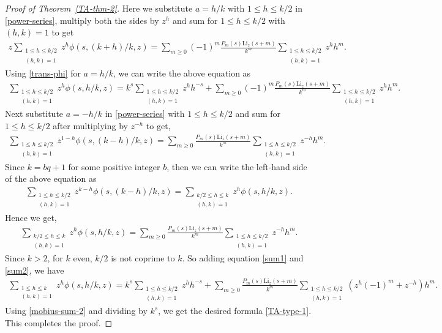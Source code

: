 \documentclass[12pt]{amsart}
\newcommand{\thmref}[1]{Theorem~\ref{#1}}
\begin{document}
\begin{proof}[Proof of \thmref{TA-thm-2}]
Here we substitute $a=h/k$ with $1\leq h\leq k/2$ in \eqref{power-series}, multiply both the sides by $z^h$ and sum for $1\leq h\leq k/2$ with $(h,k)=1$ to get
\begin{align}
z\sum_{ \substack{1\leq h\leq k/2 \\(h,k)=1}}z^h\phi(s,(k+h)/k,z)=
\sum_{m\geq0}(-1)^m\frac{P_m(s)\mathrm{Li}_z(s+m)}{k^m}\sum_{\substack{1\leq h\leq k/2 \\(h,k)=1}}z^hh^m.
\end{align}
Using \eqref{trans-phi}  for $a=h/k$, we can write the above equation as
\begin{align}\label{sum1}
\sum_{ \substack{1\leq h\leq k/2 \\(h,k)=1}}z^h\phi(s,h/k,z)=k^s\sum_{ \substack{1\leq h\leq k/2 \\(h,k)=1}}z^hh^{-s}+
\sum_{m\geq0}(-1)^m\frac{P_m(s)\mathrm{Li}_z(s+m)}{k^m}\sum_{\substack{1\leq h\leq k/2 \\(h,k)=1}}z^hh^m.
\end{align}
Next substitute $a=-h/k$ in \eqref{power-series} with $1\leq h\leq k/2$ and sum for $1\leq h\leq k/2$ after multiplying by $z^{-h}$ to get,
\begin{align*}
\sum_{ \substack{1\leq h\leq k/2 \\(h,k)=1}}z^{1-h}\phi(s,(k-h)/k,z)=\sum_{m\geq0}\frac{P_m(s)\mathrm{Li}_z(s+m)}{k^m}\sum_{\substack{1\leq h\leq k/2 \\(h,k)=1}}z^{-h}h^m.
\end{align*}
Since $k=bq+1$ for some positive integer $b$, then we can write the left-hand side of the above equation as
\begin{align*}
\sum_{ \substack{1\leq h\leq k/2 \\(h,k)=1}}z^{k-h}\phi(s,(k-h)/k,z)=\sum_{ \substack{k/2\leq h\leq k \\(h,k)=1}}z^{h}\phi(s,h/k,z).
\end{align*}
Hence we get,
\begin{align}\label{sum2}
\sum_{ \substack{k/2\leq h\leq k \\(h,k)=1}}z^{h}\phi(s,h/k,z)=\sum_{m\geq0}\frac{P_m(s)\mathrm{Li}_z(s+m)}{k^m}\sum_{\substack{1\leq h\leq k/2 \\(h,k)=1}}z^{-h}h^m.
\end{align}
Since $k>2$, for $k$ even, $k/2$ is not coprime to $k$. So adding equation \eqref{sum1} and \eqref{sum2}, we have
\begin{align*}
\sum_{ \substack{1\leq h\leq k \\(h,k)=1}}z^{h}\phi(s,h/k,z)=k^s\sum_{ \substack{1\leq h\leq k/2 \\(h,k)=1}}z^hh^{-s}
+\sum_{m\geq0}\frac{P_m(s)\mathrm{Li}_z(s+m)}{k^m}\sum_{\substack{1\leq h\leq k/2 \\(h,k)=1}}\left(z^{h}(-1)^m+z^{-h}\right)h^m.
\end{align*}
Using \eqref{mobius-sum-2} and dividing by $k^s$, we get the desired formula \eqref{TA-type-1}.
This completes the proof.
\end{proof}
\end{document}
